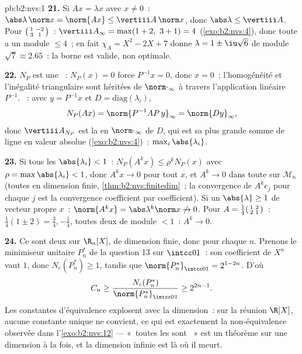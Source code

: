 \begin{solution}{pb:b2:nvs:1}
\textbf{21.} Si $Ax = \lambda x$ avec $x \neq 0$~:
$\abs\lambda\,\norm x = \norm{Ax} \leq \vertiii A\,\norm x$,
donc $\abs\lambda \leq \vertiii A$. Pour
$\begin{psmallmatrix}1 & -2\\ 3 & 1\end{psmallmatrix}$~:
$\vertiii A_\infty = \max(1 + 2,\ 3 + 1) = 4$
(\cref{exo:b2:nvs:4}), donc toute  a un module $\leq
4$~; en fait $\chi_A = X^2 - 2X + 7$ donne $\lambda = 1 \pm
\iu\sqrt6$ de module $\sqrt7 \approx 2.65$~: la borne est
valide, non optimale.

\textbf{22.} $N_P$ est une ~: $N_P(x) = 0$ force $P^{-1}x = 0$,
donc $x = 0$~; l'homogénéité et l'inégalité triangulaire sont héritées
de $\norm\cdot_\infty$ à travers l'application linéaire $P^{-1}$. ~: avec $y = P^{-1}x$ et $D = \mathrm{diag}(\lambda_i)$,
\[
N_P(Ax) = \norm{P^{-1}AP\,y}_\infty = \norm{Dy}_\infty,
\]
donc $\vertiii A_{N_P}$ est la  en $\norm\cdot_\infty$
de $D$, qui est sa plus grande somme de ligne en valeur absolue
(\cref{exo:b2:nvs:4})~: $\max_i\abs{\lambda_i}$.

\textbf{23.} Si tous les $\abs{\lambda_i} < 1$~: $N_P(A^kx) \leq
\rho^kN_P(x)$ avec $\rho = \max\abs{\lambda_i} < 1$, donc $A^kx
\to 0$ pour tout $x$, et $A^k \to 0$ dans toute  sur
$\mathcal{M}_n$ (toutes  en dimension finie,
\cref{thm:b2:nvs:finitedim}~; la convergence de $A^ke_j$ pour chaque
$j$ est la convergence coefficient par coefficient). Si un $\abs{\lambda} \geq 1$
de vecteur propre $x$~: $\norm{A^kx} = \abs\lambda^k\norm x
\not\to 0$. Pour $A = \frac14\begin{psmallmatrix}1 & 2\\ 2 &
1\end{psmallmatrix}$~:  $\frac14(1 \pm 2) =
\frac34, -\frac14$, toutes deux de module $< 1$~: $A^k \to 0$.

\textbf{24.} Ce sont deux  sur $\R_n[X]$, de dimension finie,
donc  pour chaque $n$. Prenons le minimiseur unitaire
$P^*_n$ de la question 13 sur $\intcc01$~: son coefficient de
$X^n$ vaut $1$, donc $N_c(P^*_n) \geq 1$, tandis que
$\norm{P^*_n}_{\intcc01} = 2^{1-2n}$. D'où
\[
C_n \geq \frac{N_c(P^*_n)}{\norm{P^*_n}_{\intcc01}}
\geq 2^{2n-1} .
\]
Les constantes d'équivalence explosent avec la dimension~: sur la
réunion $\R[X]$, aucune constante unique ne convient, ce qui est
exactement la non-équivalence observée dans l'\cref{exo:b2:nvs:12} ---
«~toutes les  sont ~» est un théorème sur une
dimension à la fois, et la dimension infinie est là où il meurt.


\end{solution}
